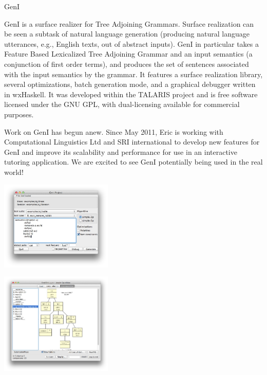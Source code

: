 \begin{hcarentry}{GenI}
\label{geni}
\makeheader

GenI is a surface realizer for Tree Adjoining Grammars.  Surface
realization can be seen a subtask of natural language generation
(producing natural language utterances, e.g., English texts, out of
abstract inputs).  GenI in particular takes a Feature Based
Lexicalized Tree Adjoining Grammar and an
input semantics (a conjunction of first order terms), and produces the
set of sentences associated with the input semantics by the grammar.  It
features a surface realization library, several optimizations, batch
generation mode, and a graphical debugger written in wxHaskell.  It was
developed within the TALARIS project and is free software licensed under
the GNU GPL, with dual-licensing available for commercial purposes.

Work on GenI has begun anew.  Since May 2011, Eric is working with
Computational Linguistics Ltd and SRI international to develop new
features for GenI and improve its scalability and performance for use in
an interactive tutoring application. We are excited to see GenI
potentially being used in the real world!

\begin{center}
\includegraphics[width=0.4\textwidth]{html/GenI-main-screenshot.jpg}
\end{center}

\begin{center}
\includegraphics[width=0.4\textwidth]{html/GenI-debugger-screenshot.jpg}
\end{center}


\end{hcarentry}
